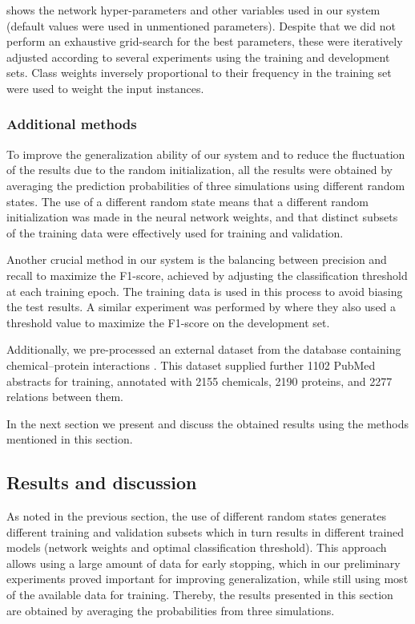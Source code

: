  shows the network hyper-parameters and other variables used in our system (default values were used in unmentioned parameters).
Despite that we did not perform an exhaustive grid-search for the best parameters, these were iteratively adjusted according to several experiments using the training and development sets.
Class weights inversely proportional to their frequency in the training set were used to weight the input instances.




\subsubsection{Additional methods}

To improve the generalization ability of our system and to reduce the fluctuation of the results due to the random initialization, all the results were obtained by averaging the prediction probabilities of three simulations using different random states.
The use of a different random state means that a different random initialization was made in the neural network weights, and that distinct subsets of the training data were effectively used for training and validation.

Another crucial method in our system is the balancing between precision and recall to maximize the F1-score, achieved by adjusting the classification threshold at each training epoch.
The training data is used in this process to avoid biasing the test results.
A similar experiment was performed by \textcite{corbett2018a} where they also used a threshold value to maximize the F1-score on the development set.

Additionally, we pre-processed an external dataset from the  database containing chemical--protein interactions \parencite{chatraryamontri2017a}.
This dataset supplied further 1102 PubMed abstracts for training, annotated with 2155 chemicals, 2190 proteins, and 2277 relations between them.

In the next section we present and discuss the obtained results using the methods mentioned in this section.


\subsection{Results and discussion}

As noted in the previous section, the use of different random states generates different training and validation subsets which in turn results in different trained models (network weights and optimal classification threshold).
This approach allows using a large amount of data for early stopping, which in our preliminary experiments proved important for improving generalization, while still using most of the available data for training.
Thereby, the results presented in this section are obtained by averaging the probabilities from three simulations.


